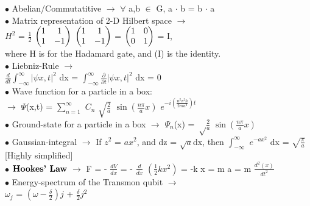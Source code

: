 \documentclass[10pt,fancy]{elegantbook}
\begin{document}
{$\bullet$ Abelian/Commutatitive $\longrightarrow$ $\forall$ a,b $\in$ G, a $\cdot$ b = b $\cdot$ a \\

$\bullet$ Matrix representation of 2-D Hilbert space $\longrightarrow$  \\ 
$H^2$ = $\frac{1}{2}$ $\begin{pmatrix}1 & 1 \cr 1 & -1 \end{pmatrix}$ $\begin{pmatrix}1 & 1 \cr 1 & -1 \end{pmatrix}$ = $\begin{pmatrix}1 & 0 \cr 0 & 1 \end{pmatrix}$ = I,  \\  
where H is for the Hadamard gate, and (I) is the identity.  \\

$\bullet$ Liebniz-Rule $\longrightarrow$  \\
$\frac{d}{dt} \int_{- \infty}^\infty |\psi{x,t}|^2$ dx = $\int_{- \infty}^\infty \frac{\partial}{\partial t} |\psi{x,t}|^2$ dx = 0 \\

$\bullet$ Wave function for a particle in a box: \\ 
$\longrightarrow$ $\Psi$(x,t) = $\sum_{n=1}^\infty$ $C_n$ $\sqrt{\frac{2}{a}}$ $\sin(\frac{n \pi}{a}x)$ $e^{- i\left( \frac{n^2 \pi^2 \hbar}{2m {a}^2} \right)t}$ \\

$\bullet$ Ground-state for a particle in a box $\longrightarrow$ $\Psi_n$(x) = ${\sqrt \frac{2}{a}}$ $\sin \left( \frac{n \pi}{a}x \right)$  \\

$\bullet$ Gaussian-integral $\longrightarrow$ If $z^2$ = ${a}x^2$, and dz = $\sqrt{a}$dx, then $\int_{- \infty}^\infty$ $e^{- a x^2}$ dx = $\sqrt{ \frac{\pi}{a}}$[Highly simplified] \\

$\bullet$ $\mathbf{\textbf{Hookes' Law}\index{Hookes' Law}}$ $\longrightarrow$ F = - $\frac{dV}{dx}$ = - $\frac{d}{dx}$ $\left( \frac{1}{2} k {x^2} \right)$ = -k x = m a = m $\frac{d^2(x)}{dt^2}$ \\

$\bullet$ Energy-spectrum of the Transmon qubit $\longrightarrow$  \\ 
$\omega_j$ = $\left( \omega - \frac{\delta}{2} \right) j$ + $\frac{\delta}{2} j^2$ \\

}
\end{document}
